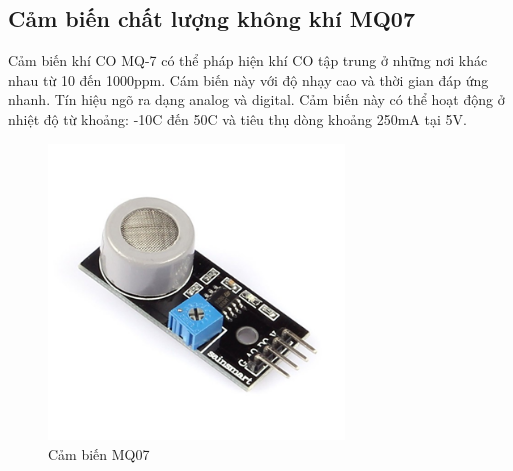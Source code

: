 \subsection*{Cảm biến chất lượng không khí MQ07} 
Cảm biến khí CO MQ-7 có thể pháp hiện khí CO tập trung ở những nơi khác nhau từ 10 đến 1000ppm. Cám biến này với độ nhạy cao và thời gian đáp ứng nhanh. Tín hiệu ngõ ra dạng analog và digital. Cảm biến này có thể hoạt động ở nhiệt độ từ khoảng: -10C đến 50C và tiêu thụ dòng khoảng 250mA tại 5V.
\begin{center}
\begin{figure}[htp]
\centering    
\includegraphics[width=0.7\textwidth]{mq07}
\caption[Cảm biến MQ07]{Cảm biến MQ07}
\label{fig:mq07}
\end{figure}
\end{center}

